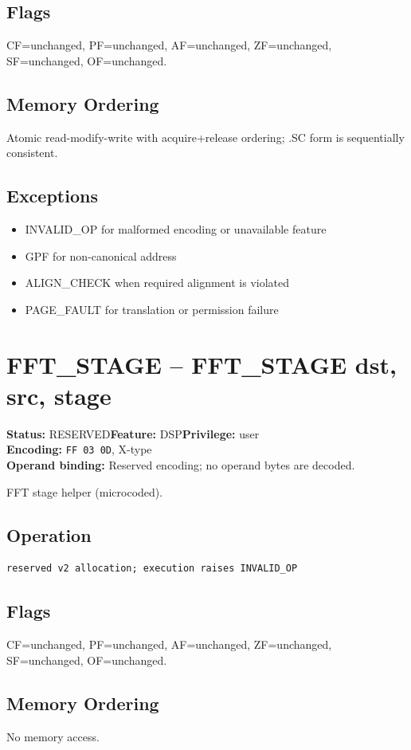 \documentclass[10pt]{article}
\begin{document}
\subsection*{Flags}
CF=unchanged, PF=unchanged, AF=unchanged, ZF=unchanged, SF=unchanged, OF=unchanged.
\subsection*{Memory Ordering}
Atomic read-modify-write with acquire+release ordering; .SC form is sequentially consistent.
\subsection*{Exceptions}
\begin{itemize}
\item INVALID\_OP for malformed encoding or unavailable feature
\item GPF for non-canonical address
\item ALIGN\_CHECK when required alignment is violated
\item PAGE\_FAULT for translation or permission failure
\end{itemize}
\clearpage

\section{FFT\_STAGE -- FFT\_STAGE dst, src, stage}
\textbf{Status:} RESERVED\quad \textbf{Feature:} DSP\quad \textbf{Privilege:} user\\
\textbf{Encoding:} \texttt{FF 03 0D}, X-type\\
\textbf{Operand binding:} Reserved encoding; no operand bytes are decoded.

FFT stage helper (microcoded).

\subsection*{Operation}
\begin{lstlisting}
reserved v2 allocation; execution raises INVALID_OP
\end{lstlisting}
\subsection*{Flags}
CF=unchanged, PF=unchanged, AF=unchanged, ZF=unchanged, SF=unchanged, OF=unchanged.
\subsection*{Memory Ordering}
No memory access.
\end{document}
